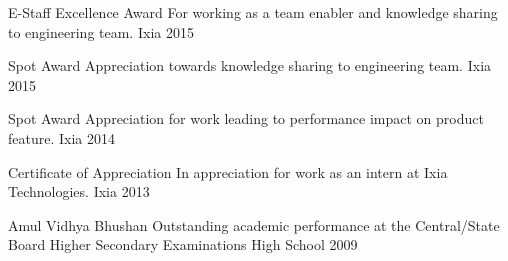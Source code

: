 



\begin{cvhonors}

  \cvhonor
    {E-Staff Excellence Award} %
    {For working as a team enabler and knowledge sharing to engineering team.} %
    {Ixia} %
    {2015} %

  \cvhonor
    {Spot Award} %
    {Appreciation towards knowledge sharing to engineering team.} %
    {Ixia} %
    {2015} %

  \cvhonor
    {Spot Award} %
    {Appreciation for work leading to performance impact on product feature.} %
    {Ixia} %
    {2014} %

  \cvhonor
    {Certificate of Appreciation} %
    {In appreciation for work as an intern at Ixia Technologies.} %
    {Ixia} %
    {2013} %

  \cvhonor
    {Amul Vidhya Bhushan} %
    {Outstanding academic performance at the Central/State Board Higher Secondary Examinations} %
    {High School} %
    {2009} %

\end{cvhonors}


